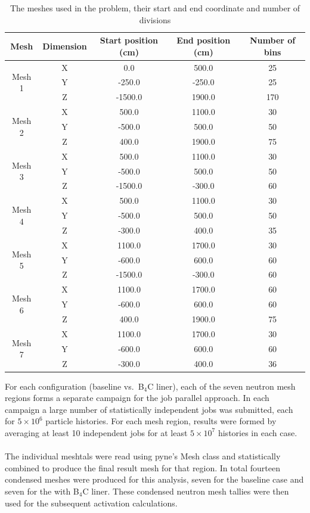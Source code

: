 \documentclass[12pt]{article}
\begin{document}
\begin{centering}
 \begin{table}[ht!]
  \begin{tabular}{c | c | c | c | c}
  \hline 
  Mesh & Dimension & Start position (cm) & End position (cm) & Number of bins\\
  \hline 
  \multirow{3}{*}{Mesh 1} & X & 0.0 & 500.0 & 25 \\ & Y & -250.0 & -250.0 & 25 \\
  & Z & -1500.0 & 1900.0 & 170 \\
  \hline
  \multirow{3}{*}{Mesh 2} & X & 500.0 & 1100.0 & 30 \\ & Y & -500.0 & 500.0 & 50\\
  & Z & 400.0 & 1900.0 & 75 \\
  \hline
  \multirow{3}{*}{Mesh 3} & X & 500.0 & 1100.0 & 30 \\ & Y & -500.0 & 500.0 & 50 \\
  & Z & -1500.0 & -300.0 & 60 \\
  \hline
  \multirow{3}{*}{Mesh 4} & X & 500.0 & 1100.0 & 30 \\ & Y & -500.0 & 500.0 & 50 \\
  & Z & -300.0 & 400.0 & 35 \\
  \hline
  \multirow{3}{*}{Mesh 5} & X & 1100.0 & 1700.0 & 30 \\ & Y & -600.0 & 600.0 & 60 \\
  & Z & -1500.0 & -300.0 & 60 \\
  \hline
  \multirow{3}{*}{Mesh 6} & X & 1100.0 & 1700.0 & 60 \\ & Y & -600.0 & 600.0 & 60 \\
  & Z & 400.0 & 1900.0 & 75\\
  \hline
  \multirow{3}{*}{Mesh 7} & X & 1100.0 & 1700.0 & 30 \\ & Y & -600.0 & 600.0 & 60 \\
  & Z & -300.0 & 400.0 & 36 
  \end{tabular}
 \caption{The meshes used in the problem, their start and end coordinate and
          number of divisions}
 \label{table:mesh_sizes}
 \end{table}
\end{centering}


For each configuration (baseline vs.\ B$_4$C liner), each of the seven neutron
mesh regions forms a separate campaign for the job parallel approach.  In each
campaign a large number of statistically independent jobs was submitted, each
for $5 \times 10^6$ particle histories.  For each mesh region, results were
formed by averaging at least 10 independent jobs for at least $5 \times 10^7$
histories in each case.
\\
\\
The individual meshtals were read using \gls{pyne}'s Mesh class and statistically
combined to produce the final result mesh for that region. In total fourteen 
condensed meshes were produced for this analysis, seven for the baseline case
and seven for the with B$_4$C liner. These condensed neutron mesh tallies were
then used for the subsequent activation calculations.
\end{document}
